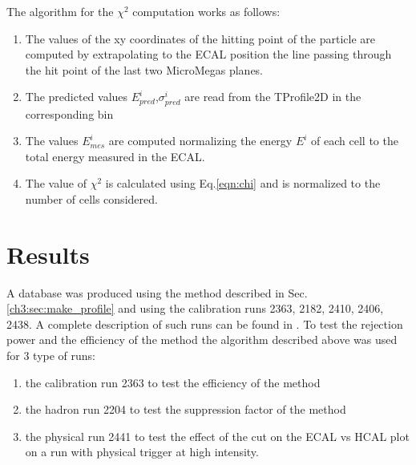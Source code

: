 The algorithm for the $\chi^2$ computation works as follows:
\begin{enumerate}
\item The values of the xy coordinates of the hitting point of the
  particle are computed by extrapolating to the ECAL position the line
  passing through the hit point of the last two MicroMegas planes.
\item The predicted values $E_{pred}^i$,$\sigma^{i}_{pred}$ are read from the TProfile2D in
  the corresponding bin
\item The values $E_{mes}^i$ are computed normalizing the energy $E^i$
  of each cell to the total energy measured in the ECAL.
\item The value of $\chi^2$ is calculated using Eq.\ref{eqn:chi} and is
  normalized to the number of cells considered.
\end{enumerate}

\section{Results}
\label{ch3:sec:chi2-result}

A database was produced using the method described in
Sec.\ref{ch3:sec:make_profile} and using the calibration runs 2363, 2182,
2410, 2406, 2438. A complete description of such runs can be found in
\cite{na64-runs}. To test the rejection power and the efficiency of the
method the algorithm described above was used for 3 type of runs:
\begin{enumerate}
\item the calibration run 2363 to test the efficiency of the method
\item the hadron run 2204 to test the suppression factor of the method
\item the physical run 2441 to test the effect of the cut on the ECAL
  vs HCAL plot on a run with physical trigger at high intensity.
\end{enumerate}

